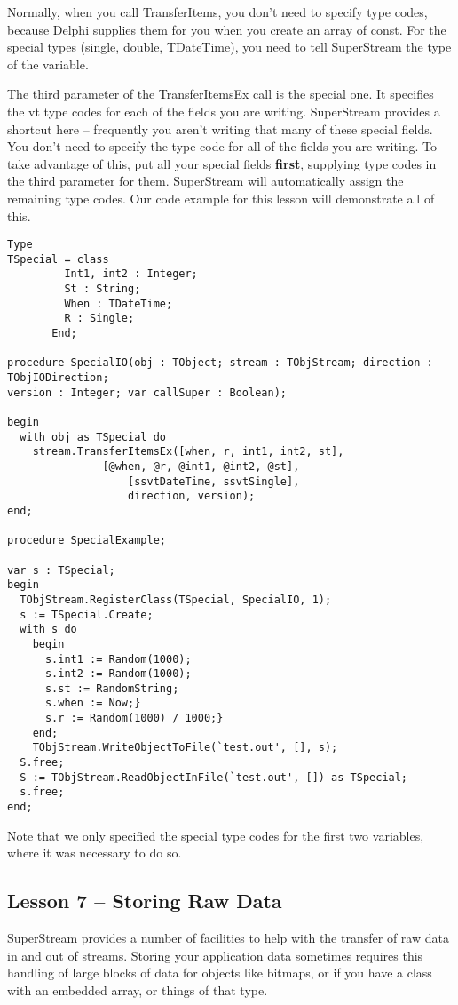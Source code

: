 \documentclass{report}
\begin{document}
Normally, when you call TransferItems, you don't need to specify type codes,
because Delphi supplies them for you when you create an array of const. For
the special types (single, double, TDateTime), you need to tell SuperStream
the type of the variable.

The third parameter of the TransferItemsEx call is the special one. It
specifies the vt type codes for each of the fields you are writing.
SuperStream provides a shortcut here -- frequently you aren't writing that
many of these special fields.  You don't need to specify the type code for
all of the fields you are writing. To take advantage of this, put all your
special fields \textbf{first}, supplying type codes in the third parameter
for them.  SuperStream will automatically assign the remaining type codes.
Our code example for this lesson will demonstrate all of this.

\begin{lstlisting}
Type
TSpecial = class	
	     Int1, int2 : Integer;
	     St : String;
	     When : TDateTime;
	     R : Single;
	   End;

procedure SpecialIO(obj : TObject; stream : TObjStream; direction : TObjIODirection;
version : Integer; var callSuper : Boolean);

begin
  with obj as TSpecial do
    stream.TransferItemsEx([when, r, int1, int2, st],
			   [@when, @r, @int1, @int2, @st],
		           [ssvtDateTime, ssvtSingle],
		           direction, version);
end;

procedure SpecialExample;

var s : TSpecial;
begin
  TObjStream.RegisterClass(TSpecial, SpecialIO, 1);
  s := TSpecial.Create;
  with s do
    begin
      s.int1 := Random(1000);
      s.int2 := Random(1000);
      s.st := RandomString;
      s.when := Now;}
      s.r := Random(1000) / 1000;}
    end;
    TObjStream.WriteObjectToFile(`test.out', [], s);
  S.free;
  S := TObjStream.ReadObjectInFile(`test.out', []) as TSpecial;
  s.free;
end;
\end{lstlisting}

Note that we only specified the special type codes for the first two
variables, where it was necessary to do so.

\subsection{Lesson 7 -- Storing Raw Data}

SuperStream provides a number of facilities to help with the transfer of raw
data in and out of streams. Storing your application data sometimes requires
this handling of large blocks of data for objects like bitmaps, or if you
have a class with an embedded array, or things of that type.
\end{document}
